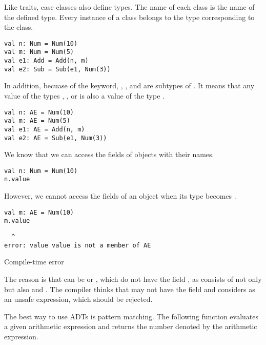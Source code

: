 Like traits, case classes also define types. The name of each class is the name
of the defined type. Every instance of a class belongs to the type corresponding
to the class.

\begin{verbatim}
val n: Num = Num(10)
val m: Num = Num(5)
val e1: Add = Add(n, m)
val e2: Sub = Sub(e1, Num(3))
\end{verbatim}

In addition, becuase of the  keyword, , , and
 are subtypes of . It means that any value of the types
, , or  is also a value of the type .

\begin{verbatim}
val n: AE = Num(10)
val m: AE = Num(5)
val e1: AE = Add(n, m)
val e2: AE = Sub(e1, Num(3))
\end{verbatim}

We know that we can access the fields of objects with their names.

\begin{verbatim}
val n: Num = Num(10)
n.value
\end{verbatim}

However, we cannot access the fields of an object when its type becomes .

\begin{verbatim}
val m: AE = Num(10)
m.value
\end{verbatim}
\vspace{-1em}
\begin{mdframed}[hidealllines=true,backgroundcolor=red!10,innerleftmargin=3pt,innerrightmargin=3pt,leftmargin=-3pt,rightmargin=-3pt]
\begin{verbatim}
  ^
error: value value is not a member of AE
\end{verbatim}
\vspace{-2em}
\begin{flushright}
\scriptsize\textsf{Compile-time error}
\end{flushright}
\end{mdframed}

The reason is that  can be  or , which do not have
the field , as  consists of not only  but also
 and . The compiler thinks that  may not have the
field  and considers  as an unsafe expression, which
should be rejected.

The best way to use ADTs is pattern matching. The following function evaluates a
given arithmetic expression and returns the number denoted by the arithmetic
expression.

